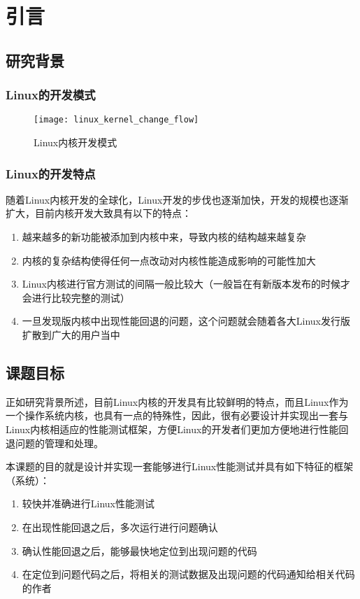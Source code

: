 
\chapter{引言}


\section{研究背景}

\subsection{Linux的开发模式}

\begin{figure}[H]
\centering
\texttt{[image: linux\_kernel\_change\_flow]}
\caption{Linux内核开发模式}
\label{fig:linux_kernel_change_flow}
\end{figure}

\subsection{Linux的开发特点}

随着Linux内核开发的全球化，Linux开发的步伐也逐渐加快，开发的规模也逐渐扩大，目前内核开发大致具有以下的特点：

\begin{enumerate}
\item 越来越多的新功能被添加到内核中来，导致内核的结构越来越复杂
\item 内核的复杂结构使得任何一点改动对内核性能造成影响的可能性加大
\item Linux内核进行官方测试的间隔一般比较大（一般旨在有新版本发布的时候才会进行比较完整的测试）
\item 一旦发现版内核中出现性能回退的问题，这个问题就会随着各大Linux发行版扩散到广大的用户当中
\end{enumerate}

\section{课题目标}

正如研究背景所述，目前Linux内核的开发具有比较鲜明的特点，而且Linux作为一个操作系统内核，也具有一点的特殊性，因此，很有必要设计并实现出一套与Linux内核相适应的性能测试框架，方便Linux的开发者们更加方便地进行性能回退问题的管理和处理。

本课题的目的就是设计并实现一套能够进行Linux性能测试并具有如下特征的框架（系统）：

\begin{enumerate}
\item 较快并准确进行Linux性能测试
\item 在出现性能回退之后，多次运行进行问题确认
\item 确认性能回退之后，能够最快地定位到出现问题的代码
\item 在定位到问题代码之后，将相关的测试数据及出现问题的代码通知给相关代码的作者
\end{enumerate}